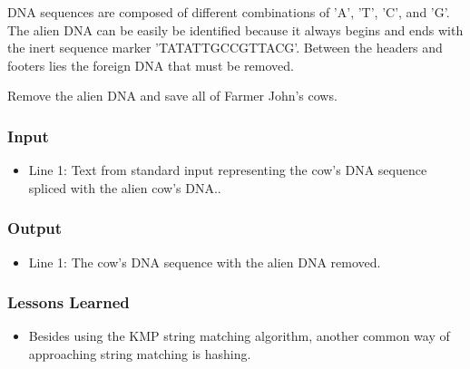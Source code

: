 DNA sequences are composed of different combinations of 'A', 'T', 'C', and 'G'.
The alien DNA can be easily be identified because it always begins and ends with the inert sequence marker \mbox{'TATATTGCCGTTACG'}.
Between the headers and footers lies the foreign DNA that must be removed.

Remove the alien DNA and save all of Farmer John's cows.

\subsubsection{Input}
\begin{itemize}
\item Line 1: Text from standard input representing the cow's DNA sequence spliced with the alien cow's DNA..
\end{itemize}


\subsubsection{Output}
\begin{itemize}
\item Line 1: The cow's DNA sequence with the alien DNA removed.
\end{itemize}


\subsubsection{Lessons Learned}
\begin{itemize}
	\item Besides using the KMP string matching algorithm, another common way of approaching string matching is hashing.
\end{itemize}

